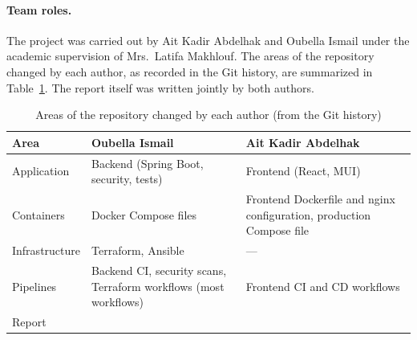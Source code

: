 \paragraph{Team roles.} The project was carried out by Ait Kadir Abdelhak and Oubella Ismail under the academic supervision of Mrs.\ Latifa Makhlouf. The areas of the repository changed by each author, as recorded in the Git history, are summarized in Table~\ref{tab:authors-areas}. The report itself was written jointly by both authors.

\begin{table}[H]
\centering
\small
\renewcommand{\arraystretch}{1.2}
\begin{tabularx}{\textwidth}{@{}>{\raggedright\arraybackslash}p{3.4cm} >{\raggedright\arraybackslash}X >{\raggedright\arraybackslash}X@{}}
\toprule
\textbf{Area} & \textbf{Oubella Ismail} & \textbf{Ait Kadir Abdelhak} \\
\midrule
Application & Backend (Spring Boot, security, tests) & Frontend (React, MUI) \\
Containers & Docker Compose files & Frontend Dockerfile and nginx configuration, production Compose file \\
Infrastructure & Terraform, Ansible & --- \\
Pipelines & Backend CI, security scans, Terraform workflows (most workflows) & Frontend CI and CD workflows \\
Report & \multicolumn{2}{c}{Written jointly} \\
\bottomrule
\end{tabularx}
\caption{Areas of the repository changed by each author (from the Git history)}
\label{tab:authors-areas}
\end{table}
